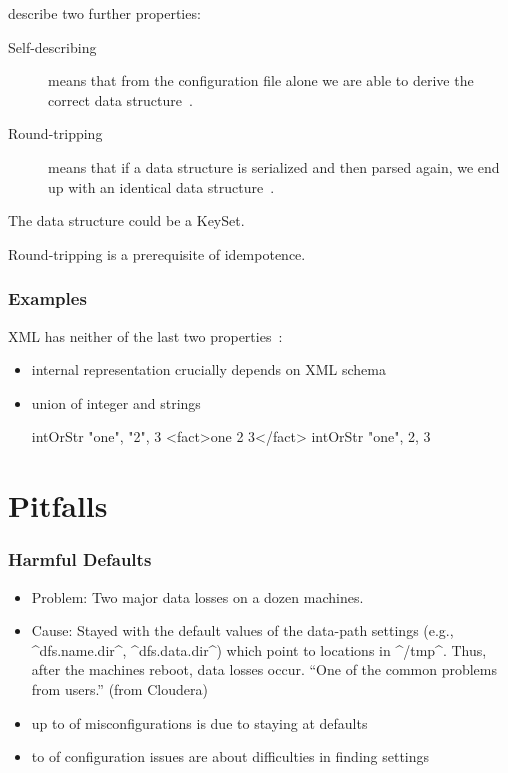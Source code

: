 \begin{frame}
	\citet{wadler2003xml} describe two further properties:
	\vspace{2em}

	\begin{description}
	\item[Self-describing]
	means that from the configuration file alone we are able to derive the correct data structure~\cite{wadler2003xml}.

	\item[Round-tripping]
	means that if a data structure is serialized and then parsed again, we end up with an identical data structure~\cite{wadler2003xml}.
	\end{description}

	The data structure could be a KeySet.

	\pause

	\vspace{2em}
	Round-tripping is a prerequisite of idempotence.
\end{frame}


\begin{frame}[fragile]
	\frametitle{Examples}

	XML has neither of the last two properties~\citet{wadler2003xml}:

	\begin{itemize} %
	\item internal representation crucially depends on XML schema
	\item union of integer and strings
	\begin{code}[gobble=4]
	intOrStr { "one", "2", 3 }
	<fact>one 2 3</fact>
	intOrStr { "one",  2,  3 }
	\end{code}

	\end{itemize}
\end{frame}



\section{Pitfalls}

\begin{frame}[fragile]
	\frametitle{Harmful Defaults~\cite{xu2015hey}}
	\begin{itemize}
	\item Problem: Two major data losses on a dozen machines.
	\item Cause:
	Stayed with the default values of the data-path settings
	(e.g., ^dfs.name.dir^, ^dfs.data.dir^) which point to locations in ^/tmp^.
	Thus, after the machines reboot, data losses occur.
	``One of the common problems from users.'' (from Cloudera)
	\item up to  of misconfigurations is due to staying at defaults
	\item {} to  of configuration issues are about difficulties in finding settings
	\end{itemize}
\end{frame}

